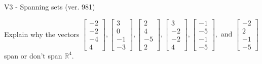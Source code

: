 \begin{exercise}
  \begin{exerciseTitle}V3 - Spanning sets (ver. 981)\end{exerciseTitle}
  \begin{exerciseStatement}
    Explain why the vectors \(\left[\begin{array}{r}
-2 \\
-2 \\
-4 \\
4
\end{array}\right] , \left[\begin{array}{r}
3 \\
0 \\
-1 \\
-3
\end{array}\right] , \left[\begin{array}{r}
2 \\
4 \\
-5 \\
2
\end{array}\right] , \left[\begin{array}{r}
3 \\
-2 \\
-2 \\
4
\end{array}\right] , \left[\begin{array}{r}
-1 \\
-5 \\
-1 \\
-5
\end{array}\right] , \text{ and } \left[\begin{array}{r}
-2 \\
2 \\
-1 \\
-5
\end{array}\right]\) span or don't span \(\mathbb{R}^4\). 
	



\end{exerciseStatement}
\end{exercise}
